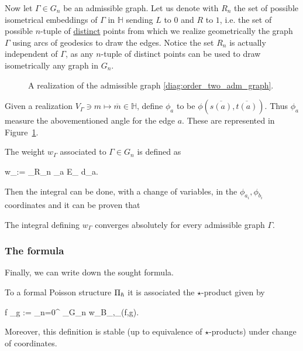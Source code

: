 \documentclass[main.tex]{subfiles}
\begin{document}
Now let $\Gamma \in G_n$ be an admissible graph. Let us denote with $R_n$ the set of possible isometrical embeddings of $\Gamma$ in $\mathbb H$ sending $L$ to $0$ and $R$ to $1$, i.e. the set of possible $n$-tuple of \underline{distinct} points from which we realize geometrically the graph $\Gamma$ using arcs of geodesics to draw the edges. Notice the set $R_n$ is actually independent of $\Gamma$, as any $n$-tuple of distinct points can be used to draw isometrically any graph in $G_n$.

\begin{figure}[H]
	\centering
	\caption{A realization of the admissible graph \eqref{diag:order_two_adm_graph}.}
	\label{fig:realization_ex}
\end{figure}

Given a realization $V_\Gamma \ni m \mapsto \overline{m} \in \mathbb H$, define $\phi_a$ to be $\phi(\overline{s(a)}, \overline{t(a)})$. Thus $\phi_a$ measure the abovementioned angle for the edge $a$. These are represented in Figure~\ref{fig:realization_ex}.

\begin{definition}
	The weight $w_\Gamma$ associated to $\Gamma \in G_n$ is defined as
	\begin{eqalign}
		w_\Gamma :=  \int_{R_n} \bigwedge_{a \in E_\Gamma} d\phi_a.
	\end{eqalign}
\end{definition}

Then the integral can be done, with a change of variables, in the $\phi_{a_i}, \phi_{b_i}$ coordinates and it can be proven that

\begin{lemma}
	The integral defining $w_\Gamma$ converges absolutely for every admissible graph $\Gamma$.
\end{lemma}

\subsubsection{The formula}
Finally, we can write down the sought formula.

\begin{theorem}
	To a formal Poisson structure $\Pi_{\boldsymbol\hslash}$ it is associated the $\star$-product given by
	\begin{eqalign}
		f \star_\planck g := \sum_{n=0}^\infty {} \sum_{\Gamma \in G_n} w_\Gamma B_{\Gamma,\Pi_\planck}(f,g).
	\end{eqalign}
	Moreover, this definition is stable (up to equivalence of $\star$-products) under change of coordinates.
\end{theorem}
\end{document}
